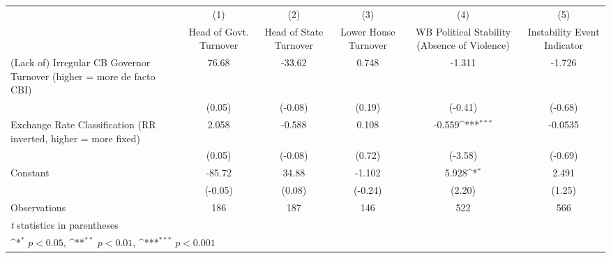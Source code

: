 {
\def\sym#1{\ifmmode^{#1}\else\(^{#1}\)\fi}
\begin{tabular*}{\linewidth}{@{\hskip\tabcolsep\extracolsep\fill}l*{5}{c}}
\toprule
                &\multicolumn{1}{c}{(1)}&\multicolumn{1}{c}{(2)}&\multicolumn{1}{c}{(3)}&\multicolumn{1}{c}{(4)}&\multicolumn{1}{c}{(5)}\\
                &\multicolumn{1}{c}{Head of Govt. Turnover}&\multicolumn{1}{c}{Head of State Turnover}&\multicolumn{1}{c}{Lower House Turnover}&\multicolumn{1}{c}{WB Political Stability (Absence of Violence)}&\multicolumn{1}{c}{Instability Event Indicator}\\
\midrule
(Lack of) Irregular CB Governor Turnover (higher = more de facto CBI)&    76.68         &   -33.62         &    0.748         &   -1.311         &   -1.726         \\
                &   (0.05)         &  (-0.08)         &   (0.19)         &  (-0.41)         &  (-0.68)         \\
\addlinespace
Exchange Rate Classification (RR inverted, higher = more fixed)&    2.058         &   -0.588         &    0.108         &   -0.559\sym{***}&  -0.0535         \\
                &   (0.05)         &  (-0.08)         &   (0.72)         &  (-3.58)         &  (-0.69)         \\
\addlinespace
Constant        &   -85.72         &    34.88         &   -1.102         &    5.928\sym{*}  &    2.491         \\
                &  (-0.05)         &   (0.08)         &  (-0.24)         &   (2.20)         &   (1.25)         \\
\midrule
Observations    &      186         &      187         &      146         &      522         &      566         \\
\bottomrule
\multicolumn{6}{l}{\footnotesize \textit{t} statistics in parentheses}\\
\multicolumn{6}{l}{\footnotesize \sym{*} \(p<0.05\), \sym{**} \(p<0.01\), \sym{***} \(p<0.001\)}\\
\end{tabular*}
}
